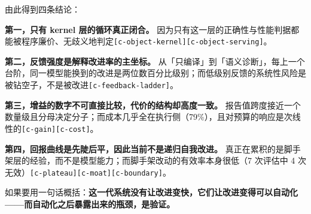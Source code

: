 由此得到四条结论：


\textbf{第一，只有 kernel 层的循环真正闭合。} 因为只有这一层的正确性与性能判据都能被程序廉价、无歧义地判定{\scriptsize\texttt{[c-\hspace{0pt}object-\hspace{0pt}kernel]}}{\scriptsize\texttt{[c-\hspace{0pt}object-\hspace{0pt}serving]}}。


\textbf{第二，反馈强度是解释改进率的主坐标。} 从「只编译」到「语义诊断」，每上一个台阶，同一模型能换到的改进是两位数百分比级别；而低级别反馈的系统性风险是被钻空子，不是被改进{\scriptsize\texttt{[c-\hspace{0pt}feedback-\hspace{0pt}ladder]}}。


\textbf{第三，增益的数字不可直接比较，代价的结构却高度一致。} 报告值跨度接近一个数量级且分母决定分子；而成本几乎全在执行侧（79\%），且对预算的响应是次线性的{\scriptsize\texttt{[c-\hspace{0pt}gain]}}{\scriptsize\texttt{[c-\hspace{0pt}cost]}}。


\textbf{第四，回报曲线是先陡后平，因此当前不是递归自我改进。} 真正在累积的是脚手架层的经验，而不是模型能力；而脚手架改动的有效率本身很低（7 次评估中 4 次无效）{\scriptsize\texttt{[c-\hspace{0pt}plateau]}}{\scriptsize\texttt{[c-\hspace{0pt}moat]}}{\scriptsize\texttt{[c-\hspace{0pt}boundary]}}。


如果要用一句话概括：\textbf{这一代系统没有让改进变快，它们让改进变得可以自动化——而自动化之后暴露出来的瓶颈，是验证。}

